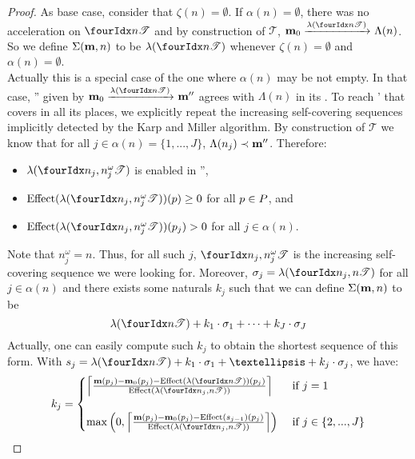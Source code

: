 \begin{proof}
  As base case, consider that $\zeta(n) = \emptyset$.
  If $\alpha(n) = \emptyset$, there was no acceleration on $\treepath{n}$ and by construction of $\mathcal{T}$, $\mari \fire{\lambda(\treepath{n})} \Lambda(n)$.
  So we define $\Sigma(\mathbf{m}, n)$ to be $\lambda(\treepath{n})$ whenever $\zeta(n) = \emptyset$ and $\alpha(n) = \emptyset$.\\
  Actually this is a special case of the one where $\alpha(n)$ may be not empty.
  In that case, \mar'' given by $\mari \fire{\lambda(\treepath{n})} \mar''$ agrees with $\Lambda(n)$ in its \noplaces.
  To reach \mar' that covers \mar in all its places, we explicitly repeat the increasing self-covering sequences implicitly detected by the Karp and Miller algorithm.
  By construction of $\mathcal{T}$ we know that for all $j \in \alpha(n) = \{1, ..., J\}$, $\Lambda(n_j) \prec \mathbf{m}''$.
  Therefore:
  \begin{itemize}
    \item $\lambda(\treepath{n_j,n^\omega_j})$ is enabled in \mar'',
    \item $\Effect(\lambda(\treepath{n_j,n^\omega_j}))(p) \geq 0$ for all $p \in P$, and
    \item $\Effect(\lambda(\treepath{n_j,n^\omega_j}))(p_j) > 0$ for all $j \in \alpha(n)$.
  \end{itemize}
  Note that $n^\omega_j = n$.
  Thus, for all such $j$, $\treepath{n_j,n^\omega_j}$ is the increasing self-covering sequence we were looking for.
  Moreover, %
  $\seqt_j = \lambda(\treepath{n_j,n})$ for all $j \in \alpha(n)$
  and
  there exists some naturals $k_j$ such that we can define $\Sigma(\mathbf{m}, n)$ to be
  \[ \lambda(\treepath{n}) + k_1 \cdot \seqt_1 + \dots + k_J \cdot \seqt_J \] 
  Actually, one can easily compute such $k_j$ to obtain the shortest sequence of this form.
  With $s_j = \lambda(\treepath{n}) + k_1 \cdot \seqt_1 + … + k_j \cdot \seqt_j$, we have:
  \[
    k_j =
    \begin{cases}
      \left\lceil
        \frac{\mar(p_j) - \mari(p_j) - \Effect(\lambda(\treepath{n}))(p_j)}
            {\Effect(\lambda(\treepath{n_j,n}))}
      \right\rceil
      &\text{ if } j = 1\\
      \\
      \max\left(0,
        \left\lceil
          \frac{\mar(p_j) - \mari(p_j) - \Effect(s_{j-1})(p_j)}
              {\Effect(\lambda(\treepath{n_j,n}))}
        \right\rceil
      \right)
      &\text{ if } j \in \{2, ..., J\}
    \end{cases}
  \]


\end{proof}
